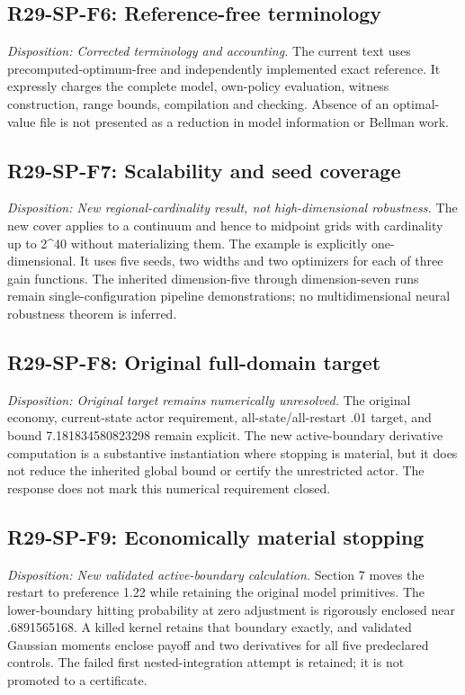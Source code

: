 \subsection{R29-SP-F6: Reference-free terminology}
\textit{Disposition: Corrected terminology and accounting.} The current text uses precomputed-optimum-free and independently implemented exact reference. It expressly charges the complete model, own-policy evaluation, witness construction, range bounds, compilation and checking. Absence of an optimal-value file is not presented as a reduction in model information or Bellman work.
\subsection{R29-SP-F7: Scalability and seed coverage}
\textit{Disposition: New regional-cardinality result, not high-dimensional robustness.} The new cover applies to a continuum and hence to midpoint grids with cardinality up to 2\textasciicircum{}40 without materializing them. The example is explicitly one-dimensional. It uses five seeds, two widths and two optimizers for each of three gain functions. The inherited dimension-five through dimension-seven runs remain single-configuration pipeline demonstrations; no multidimensional neural robustness theorem is inferred.
\subsection{R29-SP-F8: Original full-domain target}
\textit{Disposition: Original target remains numerically unresolved.} The original economy, current-state actor requirement, all-state/all-restart .01 target, and bound 7.181834580823298 remain explicit. The new active-boundary derivative computation is a substantive instantiation where stopping is material, but it does not reduce the inherited global bound or certify the unrestricted actor. The response does not mark this numerical requirement closed.
\subsection{R29-SP-F9: Economically material stopping}
\textit{Disposition: New validated active-boundary calculation.} Section 7 moves the restart to preference 1.22 while retaining the original model primitives. The lower-boundary hitting probability at zero adjustment is rigorously enclosed near .6891565168. A killed kernel retains that boundary exactly, and validated Gaussian moments enclose payoff and two derivatives for all five predeclared controls. The failed first nested-integration attempt is retained; it is not promoted to a certificate.
